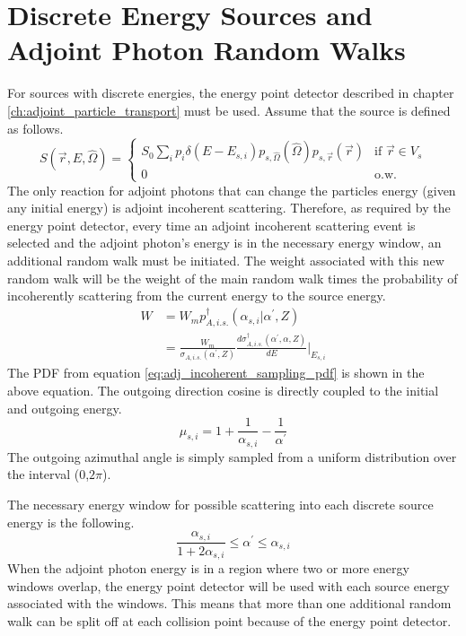 \section{Discrete Energy Sources and Adjoint Photon Random Walks}
For sources with discrete energies, the energy point detector described in
chapter \ref{ch:adjoint_particle_transport} must be used. Assume that the
source is defined as follows.
\begin{equation}
  S(\vec{r},E,\hat{\Omega}) = 
  \begin{cases}
    S_0 \sum_i p_i \delta(E - E_{s,i}) p_{s,\hat{\Omega}}(\hat{\Omega})
    p_{s,\vec{r}}(\vec{r}) & \text{if } \vec{r} \in V_s \\
    0 & \text{o.w.}
  \end{cases}
\end{equation}
The only reaction for adjoint photons that can change the particles energy 
(given any initial energy) is adjoint incoherent scattering. Therefore,
as required by the energy point detector, every time an adjoint incoherent
scattering event is selected and the adjoint photon's energy is in the 
necessary energy window, an additional random walk must be initiated. The
weight associated with this new random walk will be the weight of the main
random walk times the probability of incoherently scattering from the current 
energy to the source energy.
\begin{align}
  W & = W_m p_{A,i.s.}^{\dagger}(\alpha_{s,i}|\alpha^{'},Z) \nonumber \\
  & = \frac{W_m}{\sigma_{A,i.s.}(\alpha^{'},Z)}
  \frac{d\sigma_{A,i.s.}^{\dagger}(\alpha^{'},\alpha,Z)}{dE}\Big|_{E_{s,i}}
\end{align}
The PDF from equation \ref{eq:adj_incoherent_sampling_pdf} is shown in the 
above equation. The outgoing direction cosine is directly coupled to the 
initial and outgoing energy. 
\begin{equation}
  \mu_{s,i} = 1 + \frac{1}{\alpha_{s,i}} - \frac{1}{\alpha^{'}}
\end{equation}
The outgoing azimuthal angle is simply sampled from a uniform distribution
over the interval (0,$2\pi$). 

The necessary energy window for possible scattering into each discrete source
energy is the following.
\begin{equation}
  \frac{\alpha_{s,i}}{1+2\alpha_{s,i}} \leq \alpha^{'} \leq \alpha_{s,i}
\end{equation}
When the adjoint photon energy is in a region where two or more energy windows
overlap, the energy point detector will be used with each source energy
associated with the windows. This means that more than one additional random
walk can be split off at each collision point because of the energy point
detector. 

